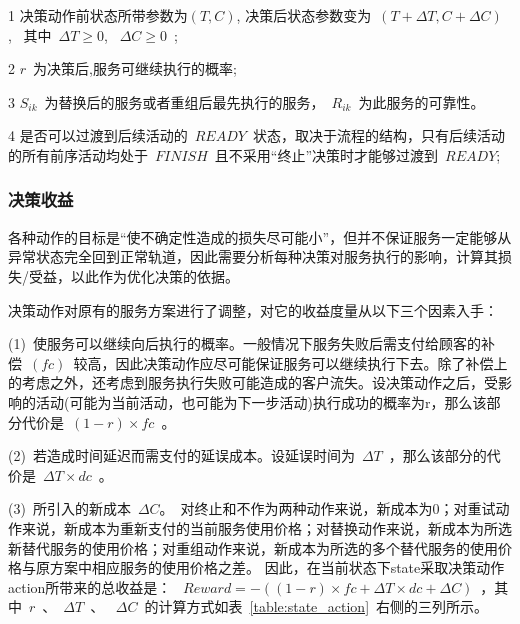 \begin{table}[htbp]
\begin{threeparttable}
\begin{tabular}{llllllll}
        \end{tabular}%
        \begin{tablenotes}
            \item[1] 决策动作前状态所带参数为$(T,C)$, 决策后状态参数变为~$(T+\Delta T, C+\Delta C)$,~ 其中~$\Delta T \ge 0$, ~$\Delta C \ge 0$~; 
            \item[2] $r$~为决策后,服务可继续执行的概率;
            \item[3] $S_{ik}$~为替换后的服务或者重组后最先执行的服务，~$R_{ik}$~为此服务的可靠性。
            \item[4] 是否可以过渡到后续活动的~$READY$~状态，取决于流程的结构，只有后续活动的所有前序活动均处于~$FINISH$~且不采用“终止”决策时才能够过渡到~$READY$;
        \end{tablenotes}
    \end{threeparttable}
\end{table}%


\subsubsection{决策收益} \label{sec:reward_section}
各种动作的目标是“使不确定性造成的损失尽可能小”，但并不保证服务一定能够从异常状态完全回到正常轨道，因此需要分析每种决策对服务执行的影响，计算其损失/受益，以此作为优化决策的依据。

决策动作对原有的服务方案进行了调整，对它的收益度量从以下三个因素入手：

(1)~使服务可以继续向后执行的概率。一般情况下服务失败后需支付给顾客的补偿~$(fc)$~较高，因此决策动作应尽可能保证服务可以继续执行下去。除了补偿上的考虑之外，还考虑到服务执行失败可能造成的客户流失。设决策动作之后，受影响的活动(可能为当前活动，也可能为下一步活动)执行成功的概率为r，那么该部分代价是~$(1-r) \times fc$~。

(2)~若造成时间延迟而需支付的延误成本。设延误时间为~$\Delta T$~，那么该部分的代价是~$\Delta T \times dc$~。

(3)~所引入的新成本~$\Delta C$。~对终止和不作为两种动作来说，新成本为0；对重试动作来说，新成本为重新支付的当前服务使用价格；对替换动作来说，新成本为所选新替代服务的使用价格；对重组动作来说，新成本为所选的多个替代服务的使用价格与原方案中相应服务的使用价格之差。
因此，在当前状态下state采取决策动作action所带来的总收益是：
~$Reward =  - ((1 - r) \times fc + \Delta T \times dc + \Delta C)$~，其中~$r$~、~$\Delta T$~、 ~$\Delta C$~的计算方式如表~\ref{table:state_action}~右侧的三列所示。

